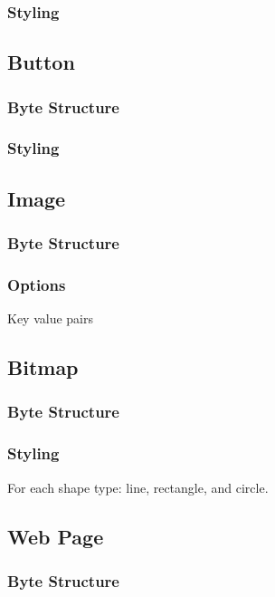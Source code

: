 \documentclass{report}
\begin{document}
\subsubsection{Styling}
\subsection{Button}
\subsubsection{Byte Structure}
\subsubsection{Styling}
\subsection{Image}
\subsubsection{Byte Structure}
\subsubsection{Options}
Key value pairs
\subsection{Bitmap}
\subsubsection{Byte Structure}
\subsubsection{Styling}
For each shape type: line, rectangle, and circle.
\subsection{Web Page}
\subsubsection{Byte Structure}
\end{document}
